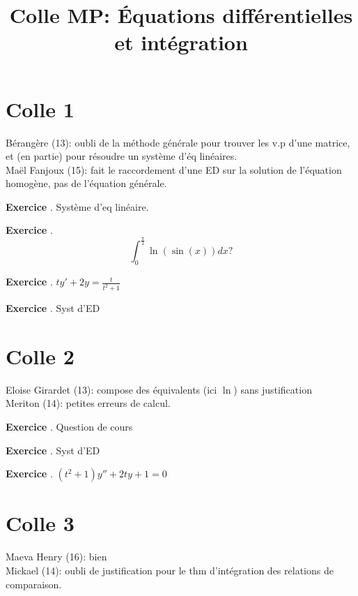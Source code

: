 \documentclass[10pt,a4paper]{article}
\title{Colle MP: Équations différentielles et intégration}
\newcounter{question}
\newcounter{exo}
\newenvironment{exo}{\vspace{0.5cm}\setcounter{question}{0}\addtocounter{exo}{1} \noindent \textbf{Exercice \theexo}. \normalsize }{\par}
\begin{document}
	\maketitle
	
	\section*{Colle 1}	
	Bérangère (13): oubli de la méthode générale pour trouver les v.p d'une matrice, et (en partie) pour résoudre un système d'éq linéaires. \\
	Maël Fanjoux (15): fait le raccordement d'une ED sur la solution de l'équation homogène, pas de l'équation générale.\\
	
	\begin{exo}
		Système d'eq linéaire.
	\end{exo}

	\begin{exo}
		$$\int_{0}^{\frac{\pi}{2}} \ln(\sin(x))dx?$$
	\end{exo}
	
	\begin{exo}
		$ty' + 2y = \frac{t}{t^2+1}$
	\end{exo}

	\begin{exo}
		Syst d'ED
	\end{exo}	
			
	\section*{Colle 2}
	\setcounter{exo}{0}
	Eloise Girardet (13): compose des équivalents (ici $\ln$) sans justification\\
	Meriton (14): petites erreurs de calcul.\\
	
	\begin{exo}
		Question de cours
	\end{exo}

	\begin{exo}
		Syst d'ED
	\end{exo}
	
	\begin{exo}
		$(t^2 + 1)y'' + 2ty + 1 = 0$
	\end{exo}
			
	\section*{Colle 3}
	\setcounter{exo}{0}
	Maeva Henry (16): bien\\
	Mickael (14): oubli de justification pour le thm d'intégration des relations de comparaison.\\
	
\end{document}
